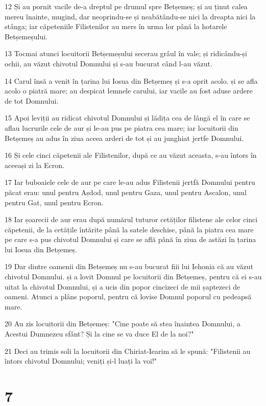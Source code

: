 \par 12 Și au pornit vacile de-a dreptul pe drumul spre Betșemeș; și au ținut calea mereu înainte, mugind, dar neoprindu-se și neabătându-se nici la dreapta nici la stânga; iar căpeteniile Filistenilor au mers în urma lor până la hotarele Betșemeșului.
\par 13 Tocmai atunci locuitorii Betșemeșului secerau grâul în vale; și ridicându-și ochii, au văzut chivotul Domnului și s-au bucurat când l-au văzut.
\par 14 Carul însă a venit în țarina lui Iosua din Betșemeș și s-a oprit acolo. și se afla acolo o piatră mare; au despicat lemnele carului, iar vacile au fost aduse ardere de tot Domnului.
\par 15 Apoi leviții au ridicat chivotul Domnului și lădița cea de lângă el în care se aflau lucrurile cele de aur și le-au pus pe piatra cea mare; iar locuitorii din Betșemeș au adus în ziua aceea arderi de tot și au junghiat jertfe Domnului.
\par 16 Și cele cinci căpetenii ale Filistenilor, după ce au văzut aceasta, s-au întors în aceeași zi la Ecron.
\par 17 Iar buboaiele cele de aur pe care le-au adus Filistenii jertfă Domnului pentru păcat erau: unul pentru Așdod, unul pentru Gaza, unul pentru Ascalon, unul pentru Gat, unul pentru Ecron.
\par 18 Iar șoarecii de aur erau după numărul tuturor cetăților filistene ale celor cinci căpetenii, de la cetățile întărite până la satele deschise, până la piatra cea mare pe care s-a pus chivotul Domnului și care se află până în ziua de astăzi în țarina lui Iosua din Betșemeș.
\par 19 Dar dintre oamenii din Betșemeș nu s-au bucurat fiii lui Iehonia că au văzut chivotul Domnului. și a lovit Domnul pe locuitorii din Betșemeș, pentru că ei s-au uitat la chivotul Domnului, și a ucis din popor cincizeci de mii șaptezeci de oameni. Atunci a plâns poporul, pentru că lovise Domnul poporul cu pedeapsă mare.
\par 20 Au zis locuitorii din Betșemeș: "Cine poate să stea înaintea Domnului, a Acestui Dumnezeu sfânt? Și la cine se va duce El de la noi?"
\par 21 Deci au trimis soli la locuitorii din Chiriat-Iearim să le spună: "Filistenii au întors chivotul Domnului; veniți și-l luați la voi!"

\chapter{7}

